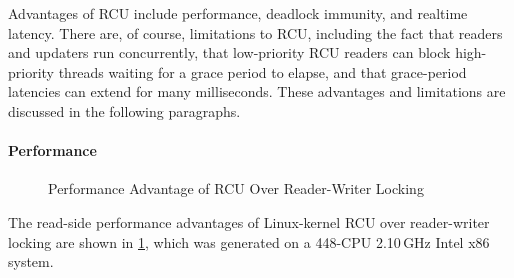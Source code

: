 Advantages of RCU include performance,
deadlock immunity, and realtime latency.
There are, of course, limitations to RCU, including the fact that
readers and updaters run concurrently, that low-priority RCU readers
can block high-priority threads waiting for a grace period to elapse,
and that grace-period latencies can extend for many milliseconds.
These advantages and limitations are discussed in the following paragraphs.

\paragraph{Performance}

\begin{figure}
\centering
{}
\caption{Performance Advantage of RCU Over Reader-Writer Locking}
\label{fig:defer:Performance Advantage of RCU Over Reader-Writer Locking}
\end{figure}

The read-side performance advantages of Linux-kernel RCU over
reader-writer locking are shown in
\cref{fig:defer:Performance Advantage of RCU Over Reader-Writer Locking},
which was generated on a 448-CPU 2.10\,GHz Intel x86 system.

